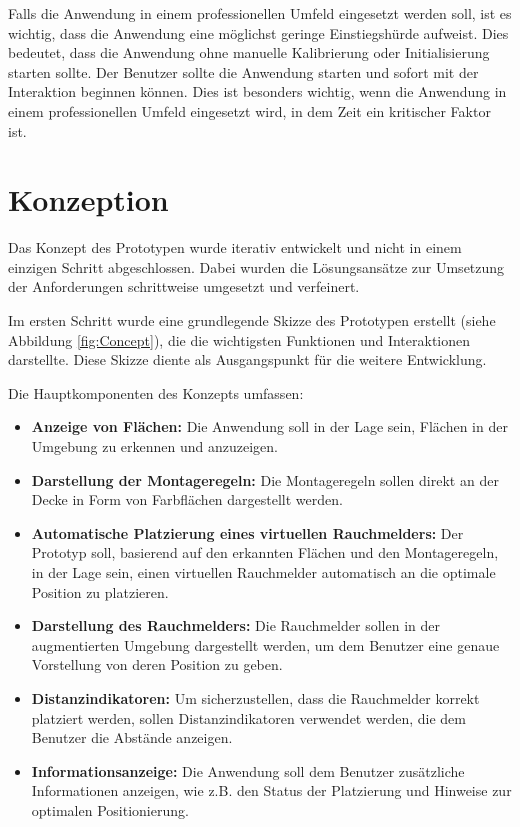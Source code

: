 Falls die Anwendung in einem professionellen Umfeld eingesetzt werden soll, ist es wichtig, dass die Anwendung eine möglichst geringe Einstiegshürde aufweist. Dies bedeutet, dass die Anwendung ohne manuelle Kalibrierung oder Initialisierung starten sollte. Der Benutzer sollte die Anwendung starten und sofort mit der Interaktion beginnen können. Dies ist besonders wichtig, wenn die Anwendung in einem professionellen Umfeld eingesetzt wird, in dem Zeit ein kritischer Faktor ist.

\section{Konzeption}

Das Konzept des Prototypen wurde iterativ entwickelt und nicht in einem einzigen Schritt abgeschlossen. Dabei wurden die Lösungsansätze zur Umsetzung der Anforderungen schrittweise umgesetzt und verfeinert.

Im ersten Schritt wurde eine grundlegende Skizze des Prototypen erstellt (siehe Abbildung \ref{fig:Concept}), die die wichtigsten Funktionen und Interaktionen darstellte. Diese Skizze diente als Ausgangspunkt für die weitere Entwicklung.

Die Hauptkomponenten des Konzepts umfassen:

\begin{itemize}
    \item \textbf{Anzeige von Flächen:} Die Anwendung soll in der Lage sein, Flächen in der Umgebung zu erkennen und anzuzeigen.
    \item \textbf{Darstellung der Montageregeln:} Die Montageregeln sollen direkt an der Decke in Form von Farbflächen dargestellt werden.
    \item \textbf{Automatische Platzierung eines virtuellen Rauchmelders:} Der Prototyp soll, basierend auf den erkannten Flächen und den Montageregeln, in der Lage sein, einen virtuellen Rauchmelder automatisch an die optimale Position zu platzieren.
    \item \textbf{Darstellung des Rauchmelders:} Die Rauchmelder sollen in der augmentierten Umgebung dargestellt werden, um dem Benutzer eine genaue Vorstellung von deren Position zu geben.
    \item \textbf{Distanzindikatoren:} Um sicherzustellen, dass die Rauchmelder korrekt platziert werden, sollen Distanzindikatoren verwendet werden, die dem Benutzer die Abstände anzeigen.
    \item \textbf{Informationsanzeige:} Die Anwendung soll dem Benutzer zusätzliche Informationen anzeigen, wie z.B. den Status der Platzierung und Hinweise zur optimalen Positionierung.
\end{itemize}


